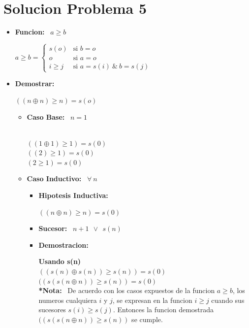 \documentclass[10pt,a4paper]{article}
\begin{document}
\section*{Solucion Problema 5}
\begin{itemize}
\item \textbf{Funcion: } \ $a\geq b$
\begin{center}
$
        a\geq b =
                \left\{
                        \begin{array}{ll}
                                s(o)  & \mbox{si } b = o \\
                                o & \mbox{si } a = o \\
                                i\geq j & \mbox{si } a = s(i)\ \&\ b = s(j)
                        \end{array}
                \right.
$
\end{center}
\item \textbf{Demostrar: }
\begin{center}
$ ((n\oplus n)\geq n)= s(o)$
\end{center}
\begin{itemize}
\item \textbf{Caso Base: } \ $ n = 1 $
\begin{center}
\
\\$ ((1\oplus1)\geq 1) = s(0) $
\
\\$ ((2)\geq 1) = s(0) $
\
\\$ (2\geq 1) = s(0) $
\end{center}
\item \textbf{Caso Inductivo: } \ $ \forall \ n$
\begin{itemize}
\item \textbf{Hipotesis Inductiva: }
\begin{center}
$ ((n\oplus n)\geq n)= s(0)$
\end{center}
\item \textbf{Sucesor: } \ $ n+1 \ \ \vee \ \ s(n) $
\item \textbf{Demostracion: }
\begin{center}
\textbf{Usando s(n)}
\
\\$ ((s(n)\oplus s(n))\geq s(n)) = s(0)$
\
\\$((s(s(n\oplus n))\geq s(n)) = s(0)$
\
\\\textbf{*Nota: }\ De acuerdo con los casos expuestos de la funcion $ a\geq b$, los numeros cualquiera $ i $ y $ j $, se expresan en la funcion $ i \geq j $ cuando sus sucesores $s(i)\geq s(j)$. Entonces la funcion demostrada $ ((s(s(n\oplus n))\geq s(n))$ se cumple.

\end{center}
\end{itemize}
\end{itemize}
\end{itemize}
\end{document}
